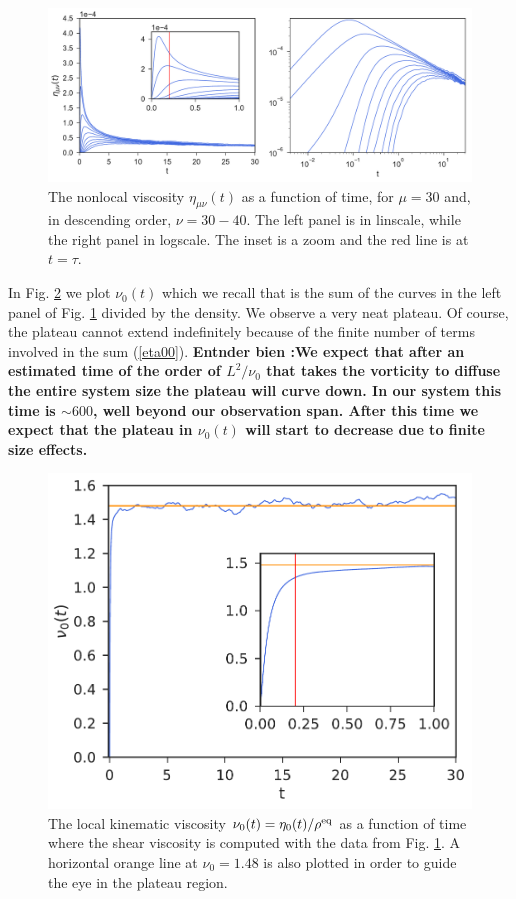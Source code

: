 \documentclass[b5paper,openright,11pt]{book}
\newcommand{\Note}[1]{{\bf \color{red}#1}}    %
\begin{document}
\begin{figure}[h!]
  \centering
\includegraphics[width=\linewidth]{Etat-PBC}
\caption[The nonlocal viscosity as a function of time for PBC system]{The nonlocal viscosity $\eta_{\mu\nu}(t)$ as a function of time, for $\mu=30$ and, in descending order, $\nu=30-40$. The left panel is in linscale, while the right panel in logscale. The inset is a zoom and the red line is at $t=\tau$.}
\label{fig:Etat-PBC}
\end{figure}


In Fig.
\ref{fig:KinVisc0t-PBC} we plot $\nu_0(t)$  which we recall that
is the sum  of the curves in  the left panel of Fig. \ref{fig:Etat-PBC} divided by the density. We observe  a very neat
plateau.  Of course, the plateau cannot extend indefinitely because of
the  finite number  of terms  involved  in the  sum (\ref{eta00}).  \Note{ Entnder bien :We
expect that after  an estimated time of the order  of $L^2/\nu_0$ that
takes the vorticity to diffuse the entire system size the plateau will
curve down.  In our system  this time is  $\sim 600$, well  beyond our
observation  span. After  this  time  we expect  that  the plateau  in
$\nu_0(t)$ will start to decrease due to finite size effects.}
\begin{figure}[h!]
  \centering
\includegraphics[scale=0.41]{KinVisc0t-PBC}
\caption[The local kinematic viscosity for PBC system]{The local kinematic viscosity $\nu_0(t)=\eta_0(t)/\rho^{\rm eq}$ as a function of time where the shear viscosity is computed with the data from Fig. \ref{fig:Etat-PBC}. A horizontal orange line at $\nu_0=1.48$ is also plotted in order to guide the eye in the plateau region.}
\label{fig:KinVisc0t-PBC}
\end{figure}
\end{document}
